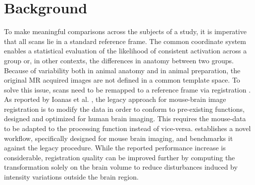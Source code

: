 \section{Background}
To make meaningful comparisons across the subjects of a study, it is imperative that all scans lie in a standard reference frame.
The common coordinate system enables a statistical evaluation of the likelihood of consistent activation across a group or, in other contexts, the differences in anatomy between two groups.
Because of variability both in animal anatomy and in animal preparation, the original MR acquired images are not defined in a common template space.
To solve this issue, scans need to be remapped to a reference frame via registration \cite{maintz_overview_nodate, sotiras_deformable_2013}.
As reported by Ioanas et al. \cite{ioanas_optimized_2019}, the legacy approach for mouse-brain image registration is to modify the data in order to conform to pre-existing functions, designed and optimized for human brain imaging.
This requires the mouse-data to be adapted to the processing function instead of vice-versa.
\cite{ioanas_optimized_2019} establishes a novel workflow, specifically designed for mouse brain imaging, and benchmarks it against the legacy procedure.
While the reported performance increase is considerable, registration quality can be improved further by computing the transformation solely on the brain volume to reduce disturbances induced by intensity variations outside the brain region.


